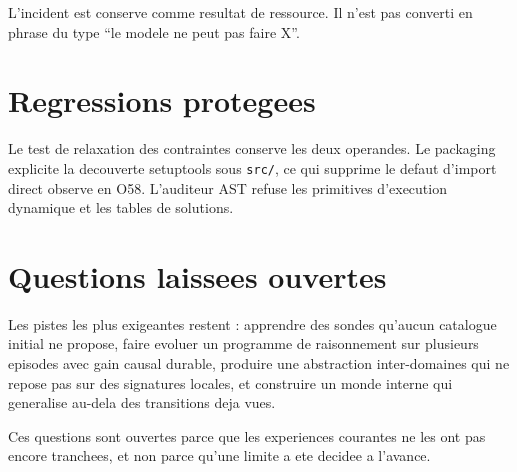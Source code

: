 \documentclass[11pt,a4paper]{article}
\begin{document}
L'incident est conserve comme resultat de ressource. Il n'est pas converti en phrase du type ``le modele ne peut pas faire X''.

\section{Regressions protegees}
Le test de relaxation des contraintes conserve les deux operandes. Le packaging explicite la decouverte setuptools sous \texttt{src/}, ce qui supprime le defaut d'import direct observe en O58. L'auditeur AST refuse les primitives d'execution dynamique et les tables de solutions.

\section{Questions laissees ouvertes}
Les pistes les plus exigeantes restent : apprendre des sondes qu'aucun catalogue initial ne propose, faire evoluer un programme de raisonnement sur plusieurs episodes avec gain causal durable, produire une abstraction inter-domaines qui ne repose pas sur des signatures locales, et construire un monde interne qui generalise au-dela des transitions deja vues.

Ces questions sont ouvertes parce que les experiences courantes ne les ont pas encore tranchees, et non parce qu'une limite a ete decidee a l'avance.
\end{document}
